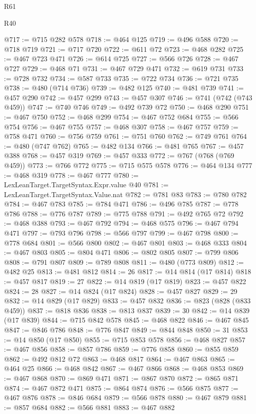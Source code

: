 \begin{lexlean}{R61}
\begin{lexlean}{R40}
\begin{coremodule}
{{{{{{{{{{{{{{{{{{{{{{{{{{{{{{{{{{{{{{{{{{{{{{{{{{{{{{{{{{{{{{{{{{{{{{{{{{{{{{{{{{{{{{{{{{{{{{{{{{{{{{{{{{{{{@717 := @715 @282 @578
@718 := @464 @125
@719 := @496 @588
@720 := @718 @719
@721 := @717 @720
@722 := @611 @72
@723 := @468 @282
@725 := @467 @723 @471
@726 := @614 @725
@727 := @566 @726
@728 := @467 @727
@729 := @468 @71
@731 := @467 @729 @471
@732 := @619 @731
@733 := @728 @732
@734 := @587 @733
@735 := @722 @734
@736 := @721 @735
@738 := @480 (@714 @736)
@739 := @482 @125
@740 := @481 @739
@741 := @457 @290
@742 := @457 @299
@743 := @457 @307
@746 := @741 (@742 (@743 @459))
@747 := @740 @746
@749 := @492 @739 @72
@750 := @468 @290
@751 := @467 @750
@752 := @468 @299
@754 := @467 @752 @684
@755 := @566 @754
@756 := @467 @755
@757 := @468 @307
@758 := @467 @757
@759 := @758 @471
@760 := @756 @759
@761 := @751 @760
@762 := @749 @761
@764 := @480 (@747 @762)
@765 := @482 @134
@766 := @481 @765
@767 := @457 @388
@768 := @457 @319
@769 := @457 @333
@772 := @767 (@768 (@769 @459))
@773 := @766 @772
@775 := @715 @575 @578
@776 := @464 @134
@777 := @468 @319
@778 := @467 @777
@780 := LexLeanTarget.TargetSyntax.Expr.value @40
@781 := LexLeanTarget.TargetSyntax.Value.nat
@782 := @781 @83
@783 := @780 @782
@784 := @467 @783
@785 := @784 @471
@786 := @496 @785
@787 := @778 @786
@788 := @776 @787
@789 := @775 @788
@791 := @492 @765 @72
@792 := @468 @388
@793 := @467 @792
@794 := @468 @575
@796 := @467 @794 @471
@797 := @793 @796
@798 := @566 @797
@799 := @467 @798
@800 := @778 @684
@801 := @566 @800
@802 := @467 @801
@803 := @468 @333
@804 := @467 @803
@805 := @804 @471
@806 := @802 @805
@807 := @799 @806
@808 := @791 @807
@809 := @789 @808
@811 := @480 (@773 @809)
@812 := @482 @25
@813 := @481 @812
@814 := 26
@817 := @14 @814 (@17 @814)
@818 := @457 @817
@819 := 27
@822 := @14 @819 (@17 @819)
@823 := @457 @822
@824 := 28
@827 := @14 @824 (@17 @824)
@828 := @457 @827
@829 := 29
@832 := @14 @829 (@17 @829)
@833 := @457 @832
@836 := @823 (@828 (@833 @459))
@837 := @818 @836
@838 := @813 @837
@839 := 30
@842 := @14 @839 (@17 @839)
@844 := @715 @842 @578
@845 := @468 @822
@846 := @467 @845
@847 := @846 @786
@848 := @776 @847
@849 := @844 @848
@850 := 31
@853 := @14 @850 (@17 @850)
@855 := @715 @853 @578
@856 := @468 @827
@857 := @467 @856
@858 := @857 @786
@859 := @776 @858
@860 := @855 @859
@862 := @492 @812 @72
@863 := @468 @817
@864 := @467 @863
@865 := @464 @25
@866 := @468 @842
@867 := @467 @866
@868 := @468 @853
@869 := @467 @868
@870 := @869 @471
@871 := @867 @870
@872 := @865 @871
@874 := @467 @872 @471
@875 := @864 @874
@876 := @566 @875
@877 := @467 @876
@878 := @846 @684
@879 := @566 @878
@880 := @467 @879
@881 := @857 @684
@882 := @566 @881
@883 := @467 @882
}}}}}}}}}}}}}}}}}}}}}}}}}}}}}}}}}}}}}}}}}}}}}}}}}}}}}}}}}}}}}}}}}}}}}}}}}}}}}}}}}}}}}}}}}}}}}}}}}}}}}}}}}}}}}
\end{coremodule}
\end{lexlean}
\end{lexlean}
